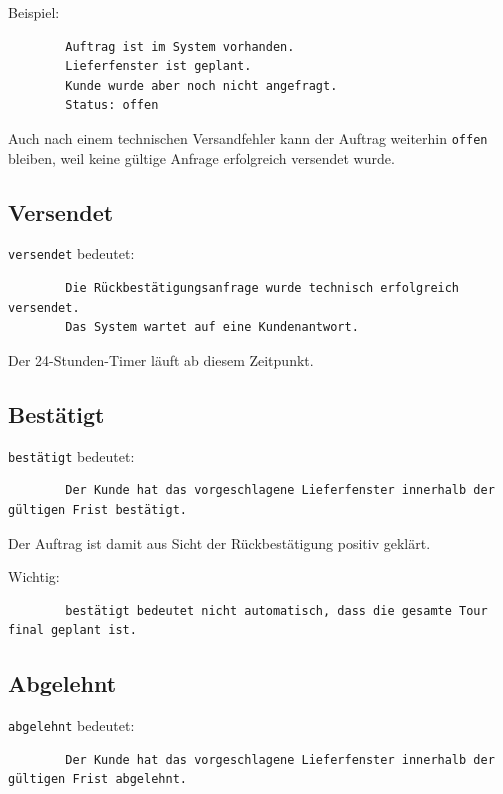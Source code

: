 \documentclass[12pt,a4paper]{article}
\begin{document}
	Beispiel:
	
	\begin{lstlisting}
		Auftrag ist im System vorhanden.
		Lieferfenster ist geplant.
		Kunde wurde aber noch nicht angefragt.
		Status: offen
	\end{lstlisting}
	
	Auch nach einem technischen Versandfehler kann der Auftrag weiterhin \texttt{offen} bleiben, weil keine gültige Anfrage erfolgreich versendet wurde.
	
	\subsection{Versendet}
	
	\texttt{versendet} bedeutet:
	
	\begin{lstlisting}
		Die Rückbestätigungsanfrage wurde technisch erfolgreich versendet.
		Das System wartet auf eine Kundenantwort.
	\end{lstlisting}
	
	Der 24-Stunden-Timer läuft ab diesem Zeitpunkt.
	
	\subsection{Bestätigt}
	
	\texttt{bestätigt} bedeutet:
	
	\begin{lstlisting}
		Der Kunde hat das vorgeschlagene Lieferfenster innerhalb der gültigen Frist bestätigt.
	\end{lstlisting}
	
	Der Auftrag ist damit aus Sicht der Rückbestätigung positiv geklärt.
	
	Wichtig:
	
	\begin{lstlisting}
		bestätigt bedeutet nicht automatisch, dass die gesamte Tour final geplant ist.
	\end{lstlisting}
	
	\subsection{Abgelehnt}
	
	\texttt{abgelehnt} bedeutet:
	
	\begin{lstlisting}
		Der Kunde hat das vorgeschlagene Lieferfenster innerhalb der gültigen Frist abgelehnt.
	\end{lstlisting}
	
\end{document}
